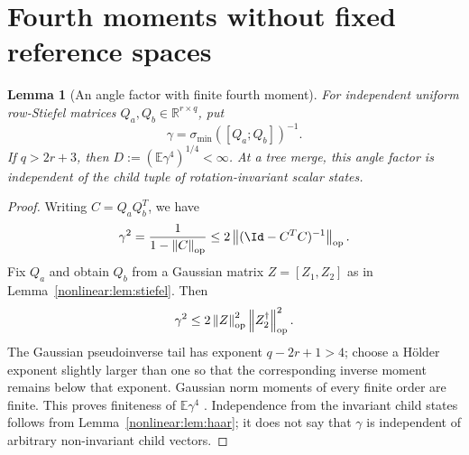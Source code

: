 \documentclass[11pt,oneside,openany,a4paper]{book}
\numberwithin{equation}{chapter}
\newtheorem{lemma}[theorem]{Lemma}
\theoremstyle{definition}
\theoremstyle{remark}
\newcommand{\R}{\mathbb R}\newcommand{\E}{\mathbb E}\newcommand{\Prb}{\mathbb P}\newcommand{\PP}{\mathbb P}
\newcommand{\op}[1]{\left\lVert#1\right\rVert_{\rm op}}
\begin{document}
\section{Fourth moments without fixed reference spaces}\label{nonlinear:sec:fourth}
\begin{lemma}[An angle factor with finite fourth moment]\label{nonlinear:lem:angle}
For independent uniform row-Stiefel matrices $Q_a,Q_b\in\R^{r\times q}$, put
\[
 \gamma=\sigma_{\min}([Q_a;Q_b])^{-1}.
\]
If $q>2r+3$, then $D:=(\E\gamma^4)^{1/4}<\infty$. At a tree merge, this angle factor is independent of the child tuple of rotation-invariant scalar states.
\end{lemma}
\begin{proof}
Writing $C=Q_aQ_b^T$, we have
\[
 \gamma^2=\frac1{1-\op C}
 \le2\op{(\Id-C^TC)^{-1}}.
\]
Fix $Q_a$ and obtain $Q_b$ from a Gaussian matrix $Z=[Z_1,Z_2]$ as in Lemma~\ref{nonlinear:lem:stiefel}. Then
\[
 \gamma^2\le2\op Z^2\op{Z_2^\dagger}^2.
\]
The Gaussian pseudoinverse tail has exponent $q-2r+1>4$; choose a H\"older exponent slightly larger than one so that the corresponding inverse moment remains below that exponent. Gaussian norm moments of every finite order are finite. This proves finiteness of $\E\gamma^4$ \cite{HMT}. Independence from the invariant child states follows from Lemma~\ref{nonlinear:lem:haar}; it does not say that $\gamma$ is independent of arbitrary non-invariant child vectors.
\end{proof}
\end{document}

